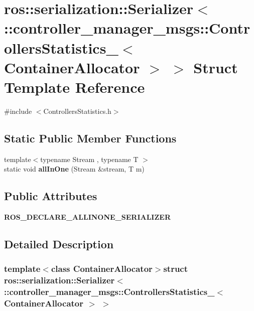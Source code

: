 \section{ros\-:\-:serialization\-:\-:\-Serializer$<$ \-:\-:controller\-\_\-manager\-\_\-msgs\-:\-:\-Controllers\-Statistics\-\_\-$<$ \-Container\-Allocator $>$ $>$ \-Struct \-Template \-Reference}
\label{structros_1_1serialization_1_1Serializer_3_01_1_1controller__manager__msgs_1_1ControllersStatistb32e2fe98775231ccb59b9cbb6bf3d16}


{\ttfamily \#include $<$\-Controllers\-Statistics.\-h$>$}

\subsection*{\-Static \-Public \-Member \-Functions}
\begin{DoxyCompactItemize}
\item 
{\footnotesize template$<$typename Stream , typename T $>$ }\\static void {\bf all\-In\-One} (\-Stream \&stream, \-T m)
\end{DoxyCompactItemize}
\subsection*{\-Public \-Attributes}
\begin{DoxyCompactItemize}
\item 
{\bf \-R\-O\-S\-\_\-\-D\-E\-C\-L\-A\-R\-E\-\_\-\-A\-L\-L\-I\-N\-O\-N\-E\-\_\-\-S\-E\-R\-I\-A\-L\-I\-Z\-E\-R}
\end{DoxyCompactItemize}


\subsection{\-Detailed \-Description}
\subsubsection*{template$<$class Container\-Allocator$>$struct ros\-::serialization\-::\-Serializer$<$ \-::controller\-\_\-manager\-\_\-msgs\-::\-Controllers\-Statistics\-\_\-$<$ Container\-Allocator $>$ $>$}



